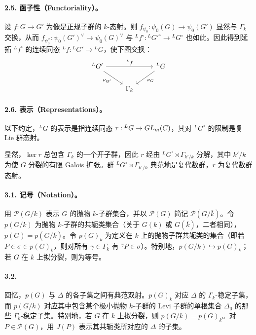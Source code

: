 \paragraph*{2.5. 函子性（Functoriality）。}
设 $f:G\to G'$ 为像是正规子群的 $k$-态射。则 $f_{\psi_0}:\psi_0(G)\to\psi_0(G')$ 显然与 $\Gamma_k$ 交换，从而 $f_{\psi_0^\vee}:\psi_0(G')^\vee\to\psi_0(G)^\vee$ 与 ${}^Lf^\circ:{}^LG'^\circ\to{}^LG^\circ$ 也如此。因此得到延拓 ${}^Lf^\circ$ 的连续同态 ${}^Lf:{}^LG'\to{}^LG$，使下图交换：
\[
\begin{tikzcd}
 {}^LG'\arrow[rr,"{}^Lf"]\arrow[dr,"\nu_{G'}"']&&{}^LG\arrow[dl,"\nu_G"]\\
 &\Gamma_k&
\end{tikzcd}
\]

\paragraph*{2.6. 表示（Representations）。}
以下约定，${}^LG$ 的表示是指连续同态 $r:{}^LG\to GL_m(C)$，其对 ${}^LG^\circ$ 的限制是复 Lie 群态射。

显然，$\ker r$ 总包含 $\Gamma_k$ 的一个开子群，因此 $r$ 经由 ${}^LG^\circ\rtimes\Gamma_{k'/k}$ 分解，其中 $k'/k$ 为使 $G$ 分裂的有限 Galois 扩张。群 ${}^LG^\circ\rtimes\Gamma_{k'/k}$ 典范地是复代数群，$r$ 为复代数群态射。

\paragraph*{3.1. 记号（Notation）。}
用 $\mathcal P(G/k)$ 表示 $G$ 的抛物 $k$-子群集合，并以 $\mathcal P(G)$ 简记 $\mathcal P(G/\overline k)$。令 $p(G/k)$ 为抛物 $k$-子群的共轭类集合（关于 $G(k)$ 或 $G(\overline k)$，二者相同），$p(G)=p(G/\overline k)$。令 $p(G)_k$ 为定义在 $k$ 上的抛物子群共轭类的集合（即若 $P\in\sigma\in p(G)_k$，则对所有 $\gamma\in\Gamma_k$ 有 ${}^\gamma P\in\sigma$）。特别地，$p(G/k)\hookrightarrow p(G)_k$；若 $G$ 在 $k$ 上拟分裂，则为等号。

\paragraph*{3.2.} 回忆，$p(G)$ 与 $\Delta$ 的各子集之间有典范双射。$p(G)_k$ 对应 $\Delta$ 的 $\Gamma_k$-稳定子集，而 $p(G/k)$ 对应其中包含某个极小抛物 $k$-子群的 Levi 子群的单根集合 $\Delta_0$ 的那些 $\Gamma_k$-稳定子集。特别地，若 $G$ 在 $k$ 上拟分裂，则 $p(G/k)=p(G)_k$。对 $P\in\mathcal P(G)$，用 $J(P)$ 表示其共轭类所对应的 $\Delta$ 的子集。

